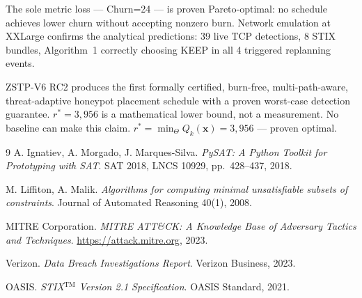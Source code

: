 \documentclass[12pt,a4paper]{article}
\newcommand{\rstar}{r^*}
\begin{document}
The sole metric loss — Churn=24 — is proven Pareto-optimal: no schedule achieves lower
churn without accepting nonzero burn. Network emulation at XXLarge confirms the
analytical predictions: 39 live TCP detections, 8 STIX bundles, Algorithm~1 correctly
choosing KEEP in all 4 triggered replanning events.

\begin{keyresult}
ZSTP-V6 RC2 produces the first formally certified, burn-free, multi-path-aware,
threat-adaptive honeypot placement schedule with a proven worst-case detection guarantee.
$\rstar{=}3{,}956$ is a mathematical lower bound, not a measurement. No baseline can make
this claim. $r^* = \min_{\Theta} Q_k(\mathbf{x}) = 3{,}956$ — proven optimal.
\end{keyresult}

\begin{thebibliography}{9}
  A. Ignatiev, A. Morgado, J. Marques-Silva.
  \textit{PySAT: A Python Toolkit for Prototyping with SAT}.
  SAT 2018, LNCS 10929, pp.\ 428--437, 2018.

  M. Liffiton, A. Malik.
  \textit{Algorithms for computing minimal unsatisfiable subsets of constraints}.
  Journal of Automated Reasoning 40(1), 2008.

  MITRE Corporation.
  \textit{MITRE ATT\&CK: A Knowledge Base of Adversary Tactics and Techniques}.
  \url{https://attack.mitre.org}, 2023.

  Verizon.
  \textit{Data Breach Investigations Report}.
  Verizon Business, 2023.

  OASIS.
  \textit{STIX$^{\text{TM}}$ Version 2.1 Specification}.
  OASIS Standard, 2021.
\end{thebibliography}
\end{document}
